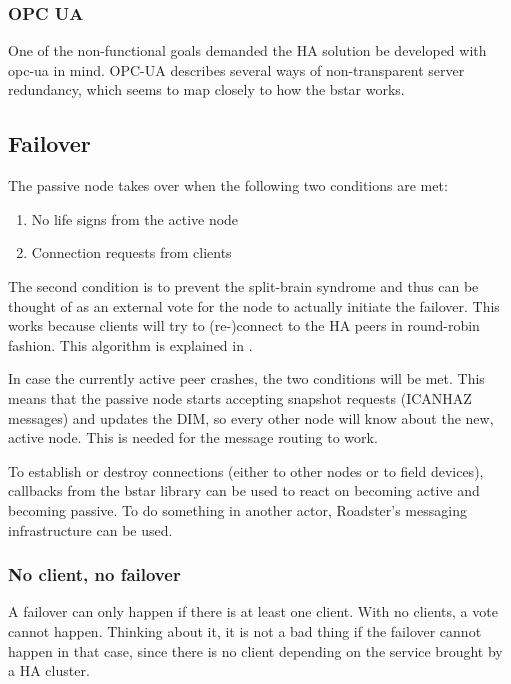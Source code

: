 \subsubsection{OPC UA}
One of the non-functional goals demanded the HA solution be developed with
\gls{opc-ua} in mind. OPC-UA describes several ways of non-transparent server
redundancy, which seems to map closely to how the \gls{bstar} works.

\subsection{Failover}
The passive node takes over when the following two conditions are met:

\begin{enumerate}
\item No life signs from the active node
\item Connection requests from clients
\end{enumerate}

The second condition is to prevent the split-brain syndrome and thus can be
thought of as an external vote for the node to actually initiate the failover.
This works because clients will try to (re-)connect to the HA peers in
round-robin fashion.  This algorithm is explained in \cite[Chapter 4 - Reliable
Request-Reply Patterns, Client-Side Reliability (Lazy Pirate
Pattern)]{zmq:zguide}.

In case the currently active peer crashes, the two conditions will be met.
This means that the passive node starts accepting snapshot requests (ICANHAZ
messages) and updates the DIM, so every other node will know about the new,
active node. This is needed for the message routing to work.

To establish or destroy connections (either to other nodes or to field
devices), callbacks from the \gls{bstar} library can be used to react on
becoming active and becoming passive. To do something in another actor,
Roadster's messaging infrastructure can be used.

\subsubsection{No client, no failover}
A failover can only happen if there is at least one client. With no clients, a
vote cannot happen. Thinking about it, it is not a bad thing if the failover
cannot happen in that case, since there is no client depending on the service
brought by a HA cluster.

